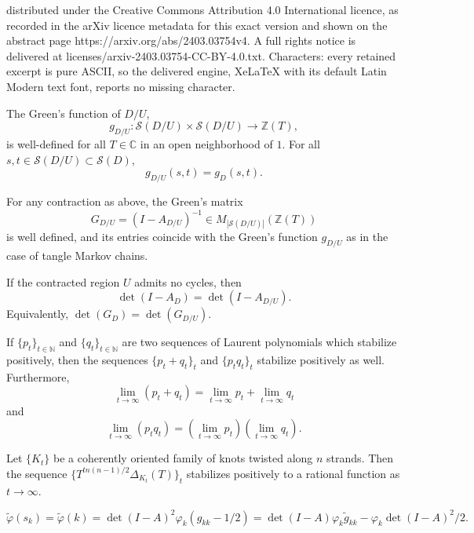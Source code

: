 \documentclass[10pt,a4paper]{amsart}
\newcommand{\C}{\mathbb{C}}
\newcommand{\N}{\mathbb{N}}
\newcommand{\Z}{\mathbb{Z}}
\begin{document}
distributed under the Creative Commons Attribution 4.0 International licence, as recorded in the arXiv licence metadata for this exact version and shown on the abstract page https://arxiv.org/abs/2403.03754v4. A full rights notice is delivered at licenses/arxiv-2403.03754-CC-BY-4.0.txt. Characters: every retained excerpt is pure ASCII, so the delivered engine, XeLaTeX with its default Latin Modern text font, reports no missing character.
	\begin{prop}
		\label{thm:cmc}
		The Green's function of $D/U$,
		$$
		g_{D/U} : \mathcal{S}(D/U) \times \mathcal{S}(D/U) \to \Z(T),
		$$
		 is well-defined for all $T \in \C$ in an open neighborhood of $1$. For all $s,t \in \mathcal{S}(D/U) \subset \mathcal{S}(D)$,
		 $$
		 	g_{D/U}(s,t) = g_D(s,t).
		 $$
	\end{prop}

	\begin{cor}
		\label{cor:g_matrix}
		For any contraction as above, the Green's matrix
		$$
		G_{D/U} = (I - A_{D/U})^{-1} \in M_{|\mathcal{S}(D/U)|}(\Z(T))
		$$
		is well defined, and its entries coincide with the Green's function $g_{D/U}$ as in the case of tangle Markov chains.
	\end{cor}

	\begin{prop}
		\label{thm:cmc_det}
		If the contracted region $U$ admits no cycles, then
		$$
		\det(I - A_D) = \det(I - A_{D/U}).
		$$
		Equivalently, $\det(G_D) = \det(G_{D/U})$.
	\end{prop}

	\begin{lemma}
		\label{lem:stab_cont}
		If $\{p_t\}_{t \in \N}$ and $\{q_t\}_{t \in \N}$ are two sequences of Laurent polynomials which stabilize positively, then the sequences $\{p_t + q_t\}_t$ and $\{p_tq_t\}_t$ stabilize positively as well. Furthermore,
		$$
		\lim_{t \to \infty} (p_t + q_t) = \lim_{t \to \infty} p_t + \lim_{t \to \infty} q_t
		$$
		and
		$$
		\lim_{t \to \infty} (p_tq_t) = (\lim_{t \to \infty} p_t)(\lim_{t \to \infty} q_t).
		$$
	\end{lemma}

	\begin{lemma}
		\label{lem:alex}
		Let $\{K_t\}$ be a coherently oriented family of knots twisted along $n$ strands. Then the sequence $\{T^{tn(n -1)/2}\Delta_{K_t}(T)\}_t$ stabilizes positively to a rational function as $t \to \infty$.
	\end{lemma}

	\begin{equation}
		\label{eq:newphi}
		\tilde{\varphi}(s_k) = \tilde{\varphi}(k) =  \det(I - A)^2 \varphi_k (g_{kk} - 1/2) = \det(I - A) \varphi_k \tilde{g}_{kk} - \varphi_k\det(I - A)^2/2.
	\end{equation}
\end{document}
